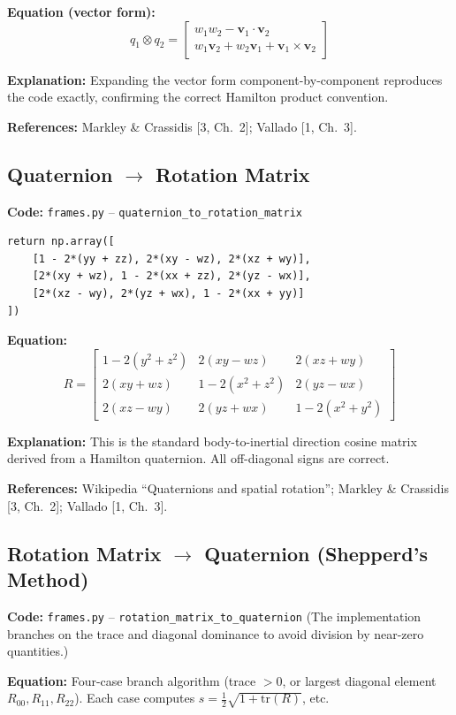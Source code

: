 \documentclass[12pt,a4paper]{article}
\begin{document}
\textbf{Equation (vector form):}
\[
q_1 \otimes q_2 = \begin{bmatrix}
w_1 w_2 - \mathbf{v}_1\cdot\mathbf{v}_2 \\[2pt]
w_1\mathbf{v}_2 + w_2\mathbf{v}_1 + \mathbf{v}_1\times\mathbf{v}_2
\end{bmatrix}
\]

\textbf{Explanation:} Expanding the vector form component-by-component reproduces the code exactly, confirming the correct Hamilton product convention.

\textbf{References:} Markley \& Crassidis [3, Ch.~2]; Vallado [1, Ch.~3].

\subsection{Quaternion $\rightarrow$ Rotation Matrix}

\textbf{Code:} \texttt{frames.py} – \texttt{quaternion\_to\_rotation\_matrix}
\begin{verbatim}
return np.array([
    [1 - 2*(yy + zz), 2*(xy - wz), 2*(xz + wy)],
    [2*(xy + wz), 1 - 2*(xx + zz), 2*(yz - wx)],
    [2*(xz - wy), 2*(yz + wx), 1 - 2*(xx + yy)]
])
\end{verbatim}

\textbf{Equation:}
\[
R = \begin{bmatrix}
1-2(y^2+z^2) & 2(xy-wz) & 2(xz+wy) \\
2(xy+wz) & 1-2(x^2+z^2) & 2(yz-wx) \\
2(xz-wy) & 2(yz+wx) & 1-2(x^2+y^2)
\end{bmatrix}
\]

\textbf{Explanation:} This is the standard body-to-inertial direction cosine matrix derived from a Hamilton quaternion. All off-diagonal signs are correct.

\textbf{References:} Wikipedia ``Quaternions and spatial rotation''; Markley \& Crassidis [3, Ch.~2]; Vallado [1, Ch.~3].

\subsection{Rotation Matrix $\rightarrow$ Quaternion (Shepperd's Method)}

\textbf{Code:} \texttt{frames.py} – \texttt{rotation\_matrix\_to\_quaternion}  
(The implementation branches on the trace and diagonal dominance to avoid division by near-zero quantities.)

\textbf{Equation:} Four-case branch algorithm (trace $>0$, or largest diagonal element $R_{00}, R_{11}, R_{22}$). Each case computes $s = \frac{1}{2}\sqrt{1 + \text{tr}(R)}$, etc.
\end{document}
